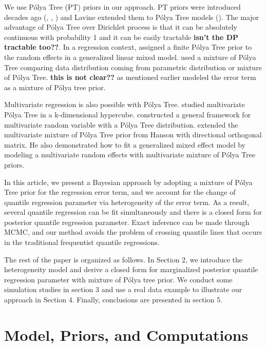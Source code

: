 \documentclass[12pt]{article}
\newcommand{\polya}{P\'{o}lya}
\begin{document}
We use \polya{} Tree (PT) priors in our approach. PT priors were introduced
decades ago (\citet{freedman1963}, \citet{fabius1964},
\citet{ferguson1974})  and  Lavine
extended them to \polya{} Tree models (\citet{lavine1992, lavine1994}). The
major advantage of 
\polya{} Tree over Dirichlet process is that it can be absolutely
continuous with probability 1 and it can be easily tractable {\bf
  isn't the DP tractable too??}. In
a regression context, \citet{walker1997, walker1999} assigned a finite
\polya{} Tree 
prior to the random effects in a generalized linear mixed
model. \citet{berger2001}  used a mixture
of \polya{} Tree comparing data distribution coming from parametric
distribution or mixture of \polya{} Tree. {\bf this is not clear??}
\citet{hanson2002} as mentioned earlier 
modeled the error term as a mixture of \polya{} tree
prior. 

Multivariate regression is also possible with \polya{}
Tree. \citet{paddock1999, paddock2002}
studied multivariate \polya{} Tree in a k-dimensional
hypercube. \citet{hanson2006} 
constructed a general framework for multivariate random 
variable with a \polya{} Tree distribution. \citet{jara2009} extended the multivariate
mixture of \polya{} Tree prior from Hanson with directional orthogonal
matrix.
He also demonstrated how to fit a
generalized mixed effect model by modeling a multivariate random effects
with multivariate mixture of \polya{} Tree priors. 

In this article, we present a Bayesian approach by adopting a mixture
of \polya{} Tree prior for the regression error term, and we account
for 
the change of quantile regression parameter via heterogeneity of the
error term. As a result, several quantile regression can be fit
simultaneously and there is a closed form for  posterior quantile
regression parameter. Exact inference can be made through MCMC, and
our method avoids the problem of 
crossing quantile lines that occurs in the
traditional frequentist quantile regressions. 

The rest of the paper is organized as follows. In Section 2, we
introduce the heterogeneity model and derive a closed form for
marginalized posterior quantile regression parameter with mixture of
\polya{} tree prior. We conduct some simulation studies in section 3 
and use a real
data example to illustrate our approach in Section 4. Finally, conclusions are
presented in section 5. 

\section{Model, Priors, and Computations}
\end{document}
